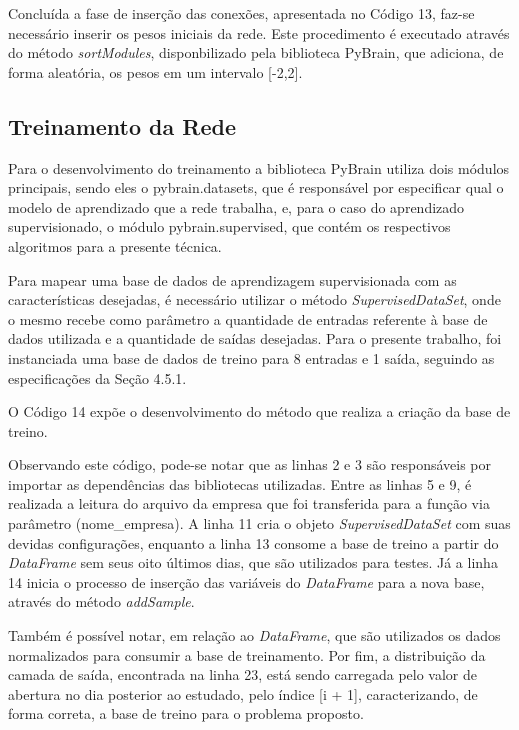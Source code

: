 

Concluída a fase de inserção das conexões, apresentada no Código 13, faz-se necessário inserir os pesos iniciais da rede. Este procedimento é executado através do método \textit{sortModules}, disponbilizado pela biblioteca PyBrain, que adiciona, de forma aleatória, os pesos em um intervalo [-2,2].

\subsection{Treinamento da Rede}
Para o desenvolvimento do treinamento a biblioteca PyBrain utiliza dois módulos principais, sendo eles o pybrain.datasets, que é responsável por especificar qual o modelo de aprendizado que a rede trabalha, e, para o caso do aprendizado supervisionado, o módulo pybrain.supervised, que contém os respectivos algoritmos para a presente técnica.

Para mapear uma base de dados de aprendizagem supervisionada com as características desejadas, é necessário utilizar o método \textit{SupervisedDataSet}, onde o mesmo recebe como parâmetro a quantidade de entradas referente à base de dados utilizada e a quantidade de saídas desejadas. Para o presente trabalho, foi instanciada uma base de dados de treino para 8 entradas e 1 saída, seguindo as especificações da Seção 4.5.1.

O Código 14 expõe o desenvolvimento do método que realiza a criação da base de treino.



Observando este código, pode-se notar que as linhas 2 e 3 são responsáveis por importar as dependências das bibliotecas utilizadas. Entre as linhas 5 e 9, é realizada a leitura do arquivo da empresa que foi transferida para a função via parâmetro (nome\_empresa). A linha 11 cria o objeto \textit{SupervisedDataSet} com suas devidas configurações, enquanto a linha 13 consome a base de treino a partir do \textit{DataFrame} sem seus oito últimos dias, que são utilizados para testes. Já a linha 14 inicia o processo de inserção das variáveis do \textit{DataFrame} para a nova base, através do método \textit{addSample}.

Também é possível notar, em relação ao \textit{DataFrame}, que são utilizados os dados normalizados para consumir a base de treinamento. Por fim, a distribuição da camada de saída, encontrada na linha 23, está sendo carregada pelo valor de abertura no dia posterior ao estudado, pelo índice [i + 1], caracterizando, de forma correta, a base de treino para o problema proposto.

